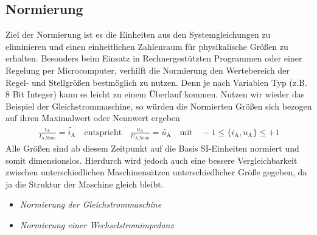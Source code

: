 \subsection{Normierung}
%
Ziel der Normierung ist es die Einheiten aus den Systemgleichungen zu eliminieren und einen einheitlichen Zahlenraum für physikalische Größen zu erhalten. Besonders beim Einsatz in Rechnergestützten Programmen oder einer Regelung per Microcomputer, verhilft die Normierung den Wertebereich der Regel- und Stellgrößen bestmöglich zu nutzen. Denn je nach Variablen Typ (z.B. 8 Bit Integer) kann es leicht zu einem Überlauf kommen. Nutzen wir wieder das Beispiel der Gleichstrommaschine, so würden die Normierten Größen sich bezogen auf ihren Maximalwert oder Nennwert ergeben \cite{SML14}
%
\begin{equation*}
\begin{aligned}
%
\frac{i_\text{A}}{I_{\text{A,Nenn}}}=\tilde{i_\text{A}} \quad \text{entspricht} \quad \frac{u_\text{A}}{U_{\text{A,Nenn}}}=\tilde{u_\text{A}} \quad \text{mit} \quad -1\leq \{i_\text{A},u_\text{A}\} \leq +1
%
\end{aligned}
\end{equation*}
%
Alle Größen sind ab diesem Zeitpunkt auf die Basis SI-Einheiten normiert und somit dimensionslos. Hierdurch wird jedoch auch eine bessere Vergleichbarkeit zwischen unterschiedlichen Maschinensätzen unterschiedlicher Größe gegeben, da ja die Struktur der Maschine gleich bleibt.
%
\begin{Aufgaben}{}{}
	\begin{itemize}
		\item \textit{Normierung der Gleichstrommaschine}
		\item \textit{Normierung einer Wechselstromimpedanz}
	\end{itemize}
\end{Aufgaben}
%
